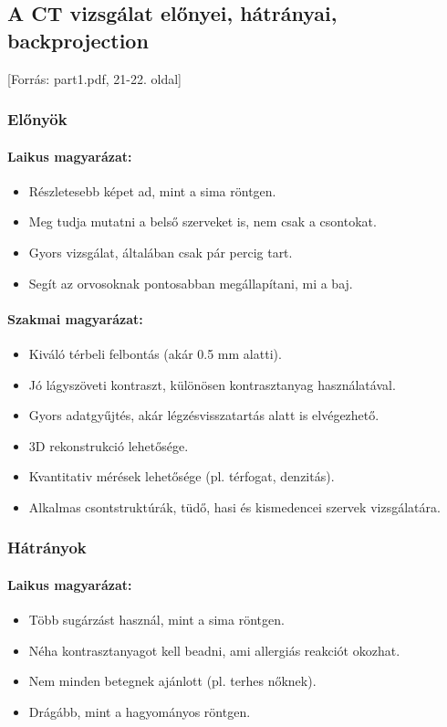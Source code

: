 \documentclass[a4paper,12pt]{article}
\begin{document}
\subsection{A CT vizsgálat előnyei, hátrányai, backprojection} [Forrás: part1.pdf, 21-22. oldal]

\subsubsection{Előnyök}

\paragraph{Laikus magyarázat:} \begin{itemize} \item Részletesebb képet ad, mint a sima röntgen. \item Meg tudja mutatni a belső szerveket is, nem csak a csontokat. \item Gyors vizsgálat, általában csak pár percig tart. \item Segít az orvosoknak pontosabban megállapítani, mi a baj. \end{itemize}

\paragraph{Szakmai magyarázat:} \begin{itemize} \item Kiváló térbeli felbontás (akár 0.5 mm alatti). \item Jó lágyszöveti kontraszt, különösen kontrasztanyag használatával. \item Gyors adatgyűjtés, akár légzésvisszatartás alatt is elvégezhető. \item 3D rekonstrukció lehetősége. \item Kvantitativ mérések lehetősége (pl. térfogat, denzitás). \item Alkalmas csontstruktúrák, tüdő, hasi és kismedencei szervek vizsgálatára. \end{itemize}

\subsubsection{Hátrányok}

\paragraph{Laikus magyarázat:} \begin{itemize} \item Több sugárzást használ, mint a sima röntgen. \item Néha kontrasztanyagot kell beadni, ami allergiás reakciót okozhat. \item Nem minden betegnek ajánlott (pl. terhes nőknek). \item Drágább, mint a hagyományos röntgen. \end{itemize}
\end{document}
